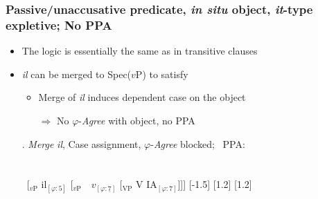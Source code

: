 \documentclass[letterpaper,10pt]{handout_nick}
\begin{document}
\subsubsection{Passive/unaccusative predicate, \emph{in situ} object, \emph{it}-type expletive; No PPA}
\begin{itemize}
\item The logic is essentially the same as in transitive clauses 
\item \emph{il} can be merged to Spec($v$P) to satisfy \fm{$\varphi$} 
\begin{itemize}
\item Merge of \emph{il} induces dependent case on the object
\item[$\Rightarrow$] No $\varphi$-\emph{Agree} with object, no PPA
\end{itemize}
\ex. \emph{Merge} \emph{il}, Case assignment, $\varphi$-\emph{Agree} blocked; \xmark\ PPA:\\\\\\
\ [$_\text{$v$P}$ \hspace*{-.3cm}il$_{[\varphi:5]}$ [$_\text{$v$P}$\ \ \hspace*{-.2cm}\hspace*{-.2cm}$v_{[\varphi:\underline{7}]}$ [$_\text{VP}$ V \hspace*{-.3cm}IA$_{[\varphi:7]}$]]]
[-1.5]
[1.2]
[1.2]\\

\end{itemize}
\end{document}

